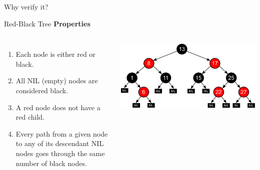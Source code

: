 \begin{frame}[standout]
  Why verify it?
\end{frame}

\begin{frame}{Red-Black Tree}
\textbf{Properties} \cite{rbtree}
\begin{columns}[T]
\begin{enumerate}
  \item Each node is either red or black.
  \item All NIL (empty) nodes are considered black.
  \item A red node does not have a red child.
  \item Every path from a given node to any of its descendant NIL nodes goes through the same number of black nodes.
\end{enumerate}

\centering
\includegraphics[width=\textwidth]{img/rbtree.png}
\end{columns}
\end{frame}

